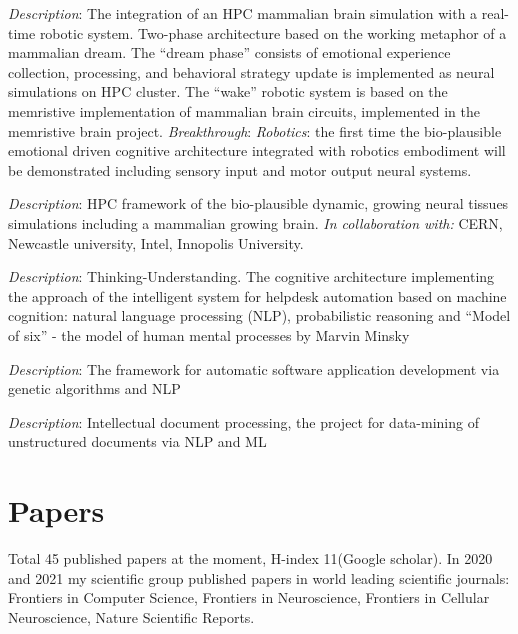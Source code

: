 \documentclass{moderncv}
\begin{document}
    {\small \emph{Description}: The integration of an HPC mammalian brain simulation with a real-time robotic system. Two-phase architecture based on the working metaphor of a mammalian dream. The ``dream phase'' consists of emotional experience collection, processing, and behavioral strategy update is implemented as neural simulations on HPC cluster. The ``wake'' robotic system is based on the memristive implementation of mammalian brain circuits, implemented in the memristive brain project.
    \emph{Breakthrough}: \emph{Robotics}: the first time the bio-plausible emotional driven cognitive architecture integrated with robotics embodiment will be demonstrated including sensory input and motor output neural systems.}

    {\small \emph{Description}: HPC framework of the bio-plausible dynamic, growing neural tissues simulations including a mammalian growing brain.
    \emph{In collaboration with:} CERN, Newcastle university, Intel, Innopolis University.}

    {\small \emph{Description}: Thinking-Understanding. The cognitive architecture implementing the approach of the intelligent system for helpdesk automation based on machine cognition: natural language processing (NLP), probabilistic reasoning and ``Model of six'' - the model of human mental processes by Marvin Minsky}

    {\small \emph{Description}: The framework for automatic software application development via genetic algorithms and NLP}

    {\small \emph{Description}: Intellectual document processing, the project for data-mining of unstructured documents via NLP and ML}

        \section{Papers}
    Total 45 published papers at the moment, H-index 11(Google scholar).
    In 2020 and 2021 my scientific group published papers in world leading scientific journals:
    Frontiers in Computer Science, Frontiers in Neuroscience, Frontiers in Cellular Neuroscience, Nature Scientific Reports.

\end{document}
